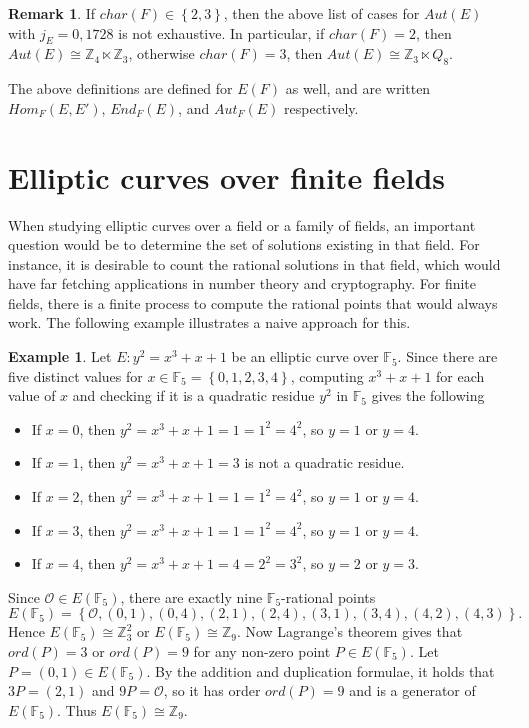 \documentclass{article}
\newcommand{\F}{\mathbb{F}}
\newcommand{\Z}{\mathbb{Z}}
\newcommand{\rb}[1]{\left( #1 \right)}
\newcommand{\cb}[1]{\left\{ #1 \right\}}
\theoremstyle{definition}
\newtheorem*{example}{Example}
\newtheorem*{remark}{Remark}
\begin{document}
\begin{remark}
If $ char\rb{F} \in \cb{2, 3} $, then the above list of cases for $ Aut\rb{E} $ with $ j_E = 0, 1728 $ is not exhaustive. In particular, if $ char\rb{F} = 2 $, then $ Aut\rb{E} \cong \Z_4 \ltimes \Z_3 $, otherwise $ char\rb{F} = 3 $, then $ Aut\rb{E} \cong \Z_3 \ltimes Q_8 $.
\end{remark}

The above definitions are defined for $ E\rb{F} $ as well, and are written $ Hom_F\rb{E, E'} $, $ End_F\rb{E} $, and $ Aut_F\rb{E} $ respectively.

\pagebreak

\section{Elliptic curves over finite fields}

When studying elliptic curves over a field or a family of fields, an important question would be to determine the set of solutions existing in that field. For instance, it is desirable to count the rational solutions in that field, which would have far fetching applications in number theory and cryptography. For finite fields, there is a finite process to compute the rational points that would always work. The following example illustrates a naive approach for this.

\begin{example}
Let $ E : y^2 = x^3 + x + 1 $ be an elliptic curve over $ \F_5 $. Since there are five distinct values for $ x \in \F_5 = \cb{0, 1, 2, 3, 4} $, computing $ x^3 + x + 1 $ for each value of $ x $ and checking if it is a quadratic residue $ y^2 $ in $ \F_5 $ gives the following
\begin{itemize}
\item If $ x = 0 $, then $ y^2 = x^3 + x + 1 = 1 = 1^2 = 4^2 $, so $ y = 1 $ or $ y = 4 $.
\item If $ x = 1 $, then $ y^2 = x^3 + x + 1 = 3 $ is not a quadratic residue.
\item If $ x = 2 $, then $ y^2 = x^3 + x + 1 = 1 = 1^2 = 4^2 $, so $ y = 1 $ or $ y = 4 $.
\item If $ x = 3 $, then $ y^2 = x^3 + x + 1 = 1 = 1^2 = 4^2 $, so $ y = 1 $ or $ y = 4 $.
\item If $ x = 4 $, then $ y^2 = x^3 + x + 1 = 4 = 2^2 = 3^2 $, so $ y = 2 $ or $ y = 3 $.
\end{itemize}
Since $ \mathcal{O} \in E\rb{\F_5} $, there are exactly nine $ \F_5 $-rational points
$$ E\rb{\F_5} = \cb{\mathcal{O}, \rb{0, 1}, \rb{0, 4}, \rb{2, 1}, \rb{2, 4}, \rb{3, 1}, \rb{3, 4}, \rb{4, 2}, \rb{4, 3}}. $$
Hence $ E\rb{\F_5} \cong \Z_3^2 $ or $ E\rb{\F_5} \cong \Z_9 $. Now Lagrange's theorem gives that $ ord\rb{P} = 3 $ or $ ord\rb{P} = 9 $ for any non-zero point $ P \in E\rb{\F_5} $. Let $ P = \rb{0, 1} \in E\rb{\F_5} $. By the addition and duplication formulae, it holds that $ 3P = \rb{2, 1} $ and $ 9P = \mathcal{O} $, so it has order $ ord\rb{P} = 9 $ and is a generator of $ E\rb{\F_5} $. Thus $ E\rb{\F_5} \cong \Z_9 $.
\end{example}
\end{document}
